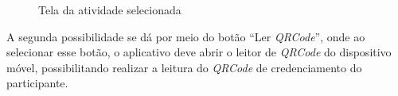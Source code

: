 \begin{figure}[H]
    \centering
    \caption{Tela da atividade selecionada}
    \label{fig:gestao15}
\end{figure}

A segunda possibilidade se dá por meio do botão “Ler \textit{QRCode}”, onde ao selecionar esse botão, o aplicativo deve abrir o leitor de \textit{QRCode} do dispositivo móvel, possibilitando realizar a leitura do \textit{QRCode} de credenciamento do participante.

